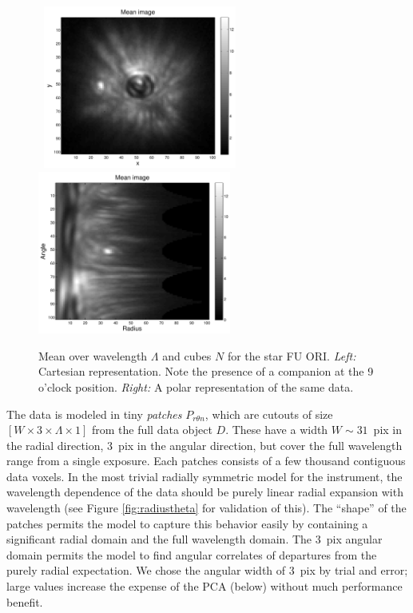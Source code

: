 \documentclass[12pt,pdftex,preprint]{aastex}
\begin{document}
\begin{figure}[h!]
\begin{center}
\mbox{
\includegraphics[width=2.5in]{figs/mean_xy.pdf}
\includegraphics[width=2.5in]{figs/mean_rt.pdf}
}
\end{center}
\vspace{-7mm}
\caption{Mean over wavelength $\Lambda$ and cubes $N$ for the star
 FU ORI. {\em Left:} Cartesian representation. Note the presence of a
 companion at the 9 o'clock position. {\em Right:} A polar representation
 of the same data.}
\label{fig:mean}
\end{figure}


The data is modeled in tiny \emph{patches} $P_{r \theta n}$, which are
cutouts of size $[W\times 3\times\Lambda\times 1]$ from the full data
object $D$.  These have a width $W\sim 31$~pix in the radial direction,
3~pix in the angular direction, but cover the full wavelength range
from a single exposure.  Each patches consists of a few thousand
contiguous data voxels.  In the most trivial radially symmetric model
for the instrument, the wavelength dependence of the data should be
purely linear radial expansion with wavelength (see Figure
\ref{fig:radiustheta} for validation of this).  The ``shape'' of the
patches permits the model to capture this behavior easily by
containing a significant radial domain and the full wavelength domain.
The 3~pix angular domain permits the model to find angular correlates
of departures from the purely radial expectation.  We chose the
angular width of 3~pix by trial and error; large values increase the
expense of the PCA (below) without much performance benefit.
\end{document}
